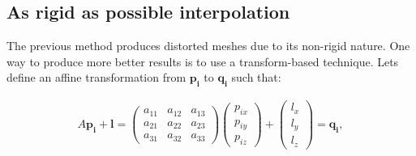 \documentclass[12pt]{article}
\begin{document}
\subsection{As rigid as possible interpolation}

The previous method produces distorted meshes due to its non-rigid nature.
One way to produce more better results is to use a transform-based technique.
Lets define an affine transformation from $\mathbf{p_i}$ to $\mathbf{q_i}$ such that:

\begin{align*}
A \mathbf{p_i} + \mathbf{l} = \begin{pmatrix}
 a_{11} & a_{12} & a_{13} \\ 
 a_{21} & a_{22} & a_{23} \\ 
 a_{31} & a_{32}  & a_{33} 
\end{pmatrix} 
\begin{pmatrix}
 p_{ix} \\ 
 p_{iy} \\ 
 p_{iz} 
\end{pmatrix} +
\begin{pmatrix}
 l_x \\ 
 l_y \\ 
 l_z
\end{pmatrix} = \mathbf{q_i},
\end{align*}
\end{document}
